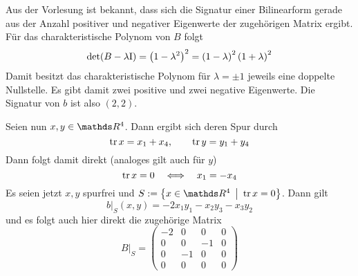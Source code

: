			Aus der Vorlesung ist bekannt, dass sich die Signatur einer Bilinearform gerade aus der Anzahl positiver und negativer Eigenwerte der zugehörigen Matrix ergibt.
			Für das charakteristische Polynom von $B$ folgt
			\[ \det (B-\lambda\mathrm{I}) = \left( 1-\lambda^2 \right)^2 = \left( 1-\lambda \right)^2\left( 1+\lambda \right)^2 \]
			Damit besitzt das charakteristische Polynom für $\lambda = \pm 1$ jeweils eine doppelte Nullstelle.
			Es gibt damit zwei positive und zwei negative Eigenwerte.
			Die Signatur von $b$ ist also $(2,2)$.


			Seien nun $x,y\in\SR^4$.
			Dann ergibt sich deren Spur durch
			\[ \operatorname{tr} x = x_1 + x_4,\qquad \operatorname{tr} y = y_1 + y_4 \]
			Dann folgt damit direkt (analoges gilt auch für $y$)
			\[ \operatorname{tr} x = 0 \quad \Longleftrightarrow \quad x_1=-x_4 \]
			Es seien jetzt $x,y$ spurfrei und $S:=\set{x\in\SR^4}{\tr x = 0}$.
			Dann gilt
			\[ b\vert_S(x,y) = -2x_1y_1 - x_2y_3 - x_3y_2 \]
			und es folgt auch hier direkt die zugehörige Matrix
			\[
				B\vert_S = 
				\begin{pmatrix}
					-2 & 0 & 0 & 0 \\
					0 & 0 & -1 & 0 \\
					0 & -1 & 0 & 0 \\
					0 & 0 & 0 & 0
				\end{pmatrix}
			\]



